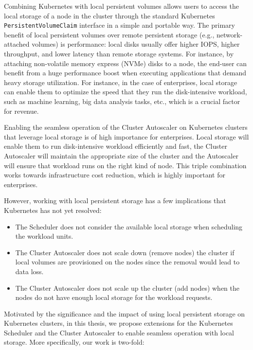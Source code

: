 Combining Kubernetes with local persistent volumes allows users to access the
local storage of a node in the cluster through the standard Kubernetes
\texttt{PersistentVolumeClaim} interface in a simple and portable way. The
primary benefit of local persistent volumes over remote persistent storage
(e.g., network-attached volumes) is performance: local disks usually offer
higher IOPS, higher throughput, and lower latency than remote storage systems.
For instance, by attaching non-volatile memory express (NVMe) disks to a node,
the end-user can benefit from a huge performance boost when executing
applications that demand heavy storage utilization. For instance, in the case of
enterprises, local storage can enable them to optimize the speed that they run
the disk-intensive workload, such as machine learning, big data analysis tasks,
etc., which is a crucial factor for revenue.

Enabling the seamless operation of the Cluster Autoscaler on Kubernetes clusters
that leverage local storage is of high importance for enterprises. Local storage
will enable them to run disk-intensive workload efficiently and fast, the
Cluster Autoscaler will maintain the appropriate size of the cluster and the
Autoscaler will ensure that workload runs on the right kind of node. This triple
combination works towards infrastructure cost reduction, which is highly
important for enterprises.


However, working with local persistent storage has a few implications that
Kubernetes has not yet resolved:
\begin{itemize}
      \tightlist
      \item The Scheduler does not consider the available local storage when
            scheduling the workload units.
      \item The Cluster Autoscaler does not scale down (remove nodes) the
            cluster if local volumes are provisioned on the nodes since the removal
            would lead to data loss.
      \item The Cluster Autoscaler does not scale up the cluster (add nodes)
            when the nodes do not have enough local storage for the workload requests.
\end{itemize}

Motivated by the significance and the impact of using local persistent storage
on Kubernetes clusters, in this thesis, we propose extensions for the Kubernetes
Scheduler and the Cluster Autoscaler to enable seamless operation with local
storage. More specifically, our work is two-fold:

